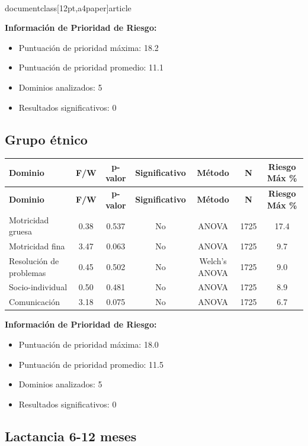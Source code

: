 \\documentclass[12pt,a4paper]{article}
\begin{document}
\textbf{Información de Prioridad de Riesgo:}
\begin{itemize}
\item Puntuación de prioridad máxima: 18.2
\item Puntuación de prioridad promedio: 11.1
\item Dominios analizados: 5
\item Resultados significativos: 0
\end{itemize}


\subsection{Grupo étnico}


\begin{longtable}{|l|c|c|c|c|c|c|}
\hline
\textbf{Dominio} & \textbf{F/W} & \textbf{p-valor} & \textbf{Significativo} & \textbf{Método} & \textbf{N} & \textbf{Riesgo Máx \%} \\
\hline
\endfirsthead

\hline
\textbf{Dominio} & \textbf{F/W} & \textbf{p-valor} & \textbf{Significativo} & \textbf{Método} & \textbf{N} & \textbf{Riesgo Máx \%} \\
\hline
\endhead

\hline
\endfoot

\hline
\endlastfoot

Motricidad gruesa & 0.38 & 0.537 & No & ANOVA & 1725 & 17.4 \\
Motricidad fina & 3.47 & 0.063 & No & ANOVA & 1725 & 9.7 \\
Resolución de problemas & 0.45 & 0.502 & No & Welch's ANOVA & 1725 & 9.0 \\
Socio-individual & 0.50 & 0.481 & No & ANOVA & 1725 & 8.9 \\
Comunicación & 3.18 & 0.075 & No & ANOVA & 1725 & 6.7 \\

\end{longtable}


\textbf{Información de Prioridad de Riesgo:}
\begin{itemize}
\item Puntuación de prioridad máxima: 18.0
\item Puntuación de prioridad promedio: 11.5
\item Dominios analizados: 5
\item Resultados significativos: 0
\end{itemize}


\subsection{Lactancia 6-12 meses}
\end{document}
